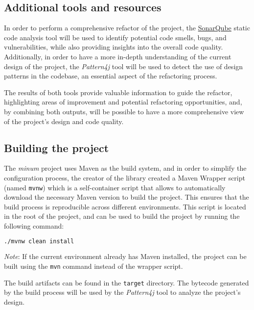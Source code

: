 \subsection{Additional tools and resources}

In order to perform a comprehensive refactor of the project, the \href{https://www.sonarsource.com/}{SonarQube} static code analysis tool will be used to identify potential code smells, bugs, and vulnerabilities, while also providing insights into the overall code quality. Additionally, in order to have a more in-depth understanding of the current design of the project, the \textit{Pattern4j} tool will be used to detect the use of design patterns in the codebase, an essential aspect of the refactoring process.

The results of both tools provide valuable information to guide the refactor, highlighting areas of improvement and potential refactoring opportunities, and, by combining both outputs, will be possible to have a more comprehensive view of the project's design and code quality.

\subsection{Building the project}

The \emph{minum} project uses Maven as the build system, and in order to simplify the configuration process, the creator of the library created a Maven Wrapper script (named \texttt{mvnw}) which is a self-container script that allows to automatically download the necessary Maven version to build the project. This ensures that the build process is reproducible across different environments. This script is located in the root of the project, and can be used to build the project by running the following command:

\begin{center}
	\begin{minipage}{0.5\textwidth}
		\begin{lstlisting}[language=bash, caption={Building the project using the Maven Wrapper script}]
    ./mvnw clean install
  \end{lstlisting}
	\end{minipage}
\end{center}

\noindent \textit{Note}: If the current environment already has Maven installed, the project can be built using the \texttt{mvn} command instead of the wrapper script.
\vspace{1em}

\noindent The build artifacts can be found in the \texttt{target} directory. The bytecode generated by the build process will be used by the \textit{Pattern4j} tool to analyze the project's design.
